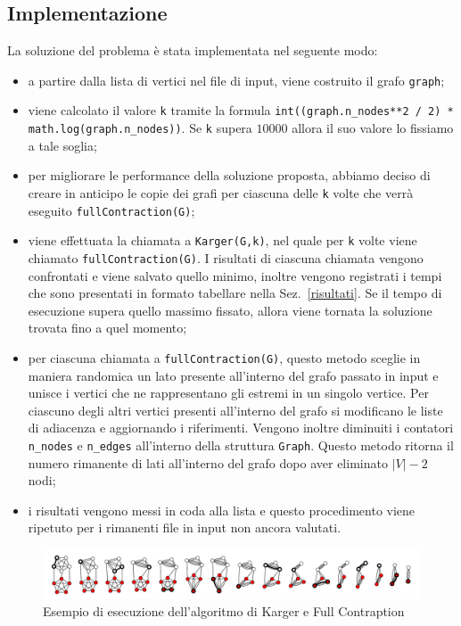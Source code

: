 \subsection{Implementazione}
	
	La soluzione del problema è stata implementata nel seguente modo:
	\begin{itemize}
		\item a partire dalla lista di vertici nel file di input, viene costruito il grafo \texttt{graph};
		\item viene calcolato il valore \texttt{k} tramite la formula \texttt{int((graph.n\_nodes**2 / 2) * \\
			math.log(graph.n\_nodes))}. Se \texttt{k} supera $10000$ allora il suo valore lo fissiamo a tale soglia;
		\item per migliorare le performance della soluzione proposta, abbiamo deciso di creare in anticipo le copie dei grafi per ciascuna delle \texttt{k} volte che verrà eseguito \texttt{fullContraction(G)};
		\item viene effettuata la chiamata a \texttt{Karger(G,k)}, nel quale per \texttt{k} volte viene chiamato \texttt{fullContraction(G)}. I risultati di ciascuna chiamata vengono confrontati e viene salvato quello minimo, inoltre vengono registrati i tempi che sono presentati in formato tabellare nella Sez.~\ref{risultati}. Se il tempo di esecuzione supera quello massimo fissato, allora viene tornata la soluzione trovata fino a quel momento;
		\item per ciascuna chiamata a \texttt{fullContraction(G)}, questo metodo sceglie in maniera randomica un lato presente all'interno del grafo passato in input e unisce i vertici che ne rappresentano gli estremi in un singolo vertice. Per ciascuno degli altri vertici presenti all'interno del grafo si modificano le liste di adiacenza e aggiornando i riferimenti. Vengono inoltre diminuiti i contatori \texttt{n\_nodes} e \texttt{n\_edges} all'interno della struttura \texttt{Graph}. Questo metodo ritorna il numero rimanente di lati all'interno del grafo dopo aver eliminato $|V|-2$ nodi;
		\item i risultati vengono messi in coda alla lista e questo procedimento viene ripetuto per i rimanenti file in input non ancora valutati.
	\end{itemize}

	\vspace{1cm}
	\begin{center}
		\begin{figure}[H]
			\centering
			\includegraphics[width=\linewidth]{Img/example_1.png}
			\caption{Esempio di esecuzione dell'algoritmo di Karger e Full Contraption}
		\end{figure}
	\end{center}
	\vspace{-1cm}
		

